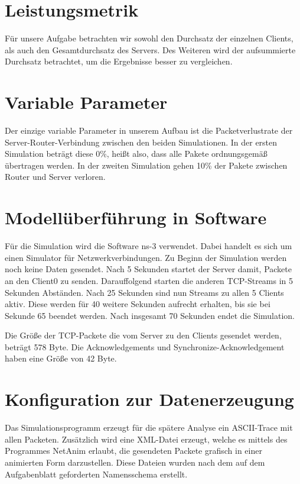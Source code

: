 \documentclass[a4paper, 12pt]{scrartcl}
\begin{document}
\section{Leistungsmetrik}
Für unsere Aufgabe betrachten wir sowohl den Durchsatz der einzelnen Clients, als auch den Gesamtdurchsatz des Servers. Des Weiteren wird der aufsummierte Durchsatz betrachtet, um die Ergebnisse besser zu vergleichen.

\section{Variable Parameter}
Der einzige variable Parameter in unserem Aufbau ist die Packetverlustrate der Server-Router-Verbindung zwischen den beiden Simulationen. In der ersten Simulation beträgt diese 0\%, heißt also, dass alle Pakete ordnungsgemäß übertragen werden. In der zweiten Simulation gehen 10\% der Pakete  zwischen Router und Server verloren.

\section{Modellüberführung in Software}
Für die Simulation wird die Software ns-3 verwendet. Dabei handelt es sich um einen Simulator für Netzwerkverbindungen. 
Zu Beginn der Simulation werden noch keine Daten gesendet. Nach 5 Sekunden startet der Server damit, Packete an den Client0 zu senden. Darauffolgend starten die anderen TCP-Streams in 5 Sekunden Abständen. Nach 25 Sekunden sind nun Streams zu allen 5 Clients aktiv. Diese werden für 40 weitere Sekunden aufrecht erhalten, bis sie bei Sekunde 65 beendet werden. Nach insgesamt 70 Sekunden endet die Simulation.

Die Größe der TCP-Packete die vom Server zu den Clients gesendet werden, beträgt 578 Byte. Die  Acknowledgements und Synchronize-Acknowledgement haben eine Größe von 42 Byte.

\section{Konfiguration zur Datenerzeugung}
Das Simulationsprogramm erzeugt für die spätere Analyse ein ASCII-Trace mit allen Packeten. Zusätzlich wird eine XML-Datei erzeugt, welche es mittels des Programmes NetAnim erlaubt, die gesendeten Packete grafisch in einer animierten Form darzustellen. Diese Dateien wurden nach dem auf dem Aufgabenblatt geforderten Namensschema erstellt. \\
\end{document}
